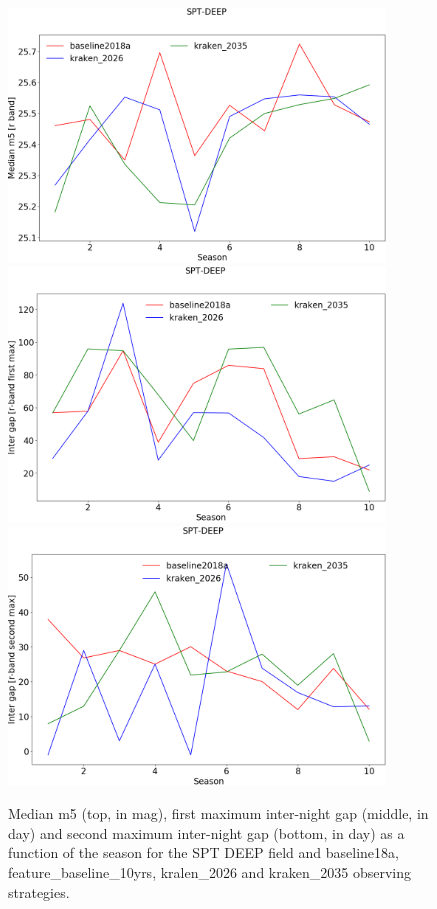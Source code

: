 \begin{figure}[htbp]
\begin{center}
  
  \includegraphics[width=10cm]{Figures/SPT-DEEP_med_m5.png}
  \includegraphics[width=10cm]{Figures/SPT-DEEP_intergap_max1.png}
    \includegraphics[width=10cm]{Figures/SPT-DEEP_intergap_max2.png}
 \caption{Median m5 (top, in mag), first maximum inter-night gap (middle, in day) and second maximum inter-night gap (bottom, in day)  as a function of the season for the SPT DEEP field and baseline18a, feature\_baseline\_10yrs, kralen\_2026 and kraken\_2035 observing strategies.}\label{fig:spt deep_m5}
\end{center}
\end{figure}


